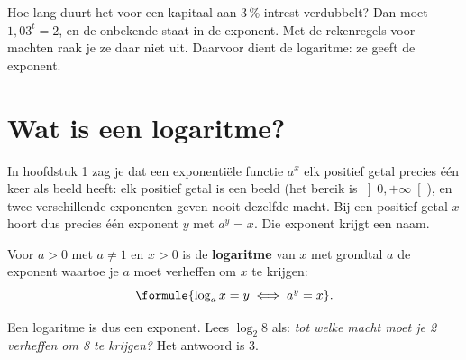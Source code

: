 %



Hoe lang duurt het voor een kapitaal aan $3$\,\% intrest verdubbelt? Dan moet $1{,}03^t = 2$, en de onbekende staat in de exponent. Met de rekenregels voor machten raak je ze daar niet uit. Daarvoor dient de logaritme: ze geeft de exponent.

\begin{oefeningen}[Start]

\end{oefeningen}

\section{Wat is een logaritme?}

In hoofdstuk 1 zag je dat een exponentiële functie $a^x$ elk positief getal precies één keer als beeld heeft: elk positief getal is een beeld (het bereik is $\left]0, +\infty\right[$), en twee verschillende exponenten geven nooit dezelfde macht. Bij een positief getal $x$ hoort dus precies één exponent $y$ met $a^y = x$. Die exponent krijgt een naam.

\begin{theorie}
Voor $a > 0$ met $a \neq 1$ en $x > 0$ is de \textbf{\textcolor{accent}{logaritme}} van $x$ met grondtal $a$ de exponent waartoe je $a$ moet verheffen om $x$ te krijgen:
\[\formule{\log_a x = y \iff a^y = x}.\]
\end{theorie}

Een logaritme is dus een exponent. Lees $\log_2 8$ als: \textit{tot welke macht moet je 2 verheffen om 8 te krijgen?} Het antwoord is 3.

